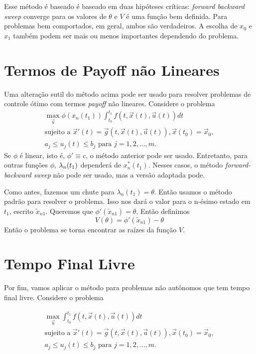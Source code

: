 Esse método é baseado é baseado em duas hipóteses críticas: \textit{forward
backward sweep} converge para os valores de $\theta$ e $V$ é uma função bem
definida. Para problemas bem comportados, em geral, ambos são verdadeiros. A
escolha de $x_0$ e $x_1$ também podem ser mais ou menos importantes dependendo
do problema. 

\section{Termos de Payoff não Lineares}

Uma alteração sutil do método acima pode ser usado para resolver problemas de
controle ótimo com termos \textit{payoff} não lineares. Considere o problema 
\begin{gather*}
    \max_{\vec{u}} \phi(x_n(t_1)) \int_{t_0}^{t_1} f(t, \vec{x}(t), \vec{u}(t)) dt \\ 
    \text{sujeito a   }\vec{x}'(t) = \vec{g}(t, \vec{x}(t), \vec{u}(t)),  
    \vec{x}(t_0) = \vec{x}_0,  \\
    a_j \le u_j(t) \le b_j \text{ para }j = 1,2,...,m.
\end{gather*}
Se $\phi$ é linear, isto é, $\phi ' \equiv c$, o método anterior pode ser
usado. Entretanto, para outras funções $\phi$, $\lambda_n(t_1)$ dependerá de
$x_n^*(t_1)$. Nesses casos, o método \textit{forward-backward sweep} não pode
ser usado, mas a versão adaptada pode.  

Como antes, fazemos um chute para $\lambda_n(t_1) = \theta$. Então usamos o
método padrão para resolver o problema. Isso nos dará o valor para o n-ésimo
estado em $t_1$, escrito $\tilde{x}_{n1}$. Queremos que $\phi
'(\tilde{x}_{n1}) = \theta$. Então definimos 
$$
V(\theta) = \phi '(\tilde{x}_{n1}) - \theta
$$
Então o problema se torna encontrar as raízes da função $V$. 

\section{Tempo Final Livre}

Por fim, vamos aplicar o método para problemas não autônomos que tem tempo
final livre. Considere o problema 

\begin{gather*}
    \max_{\vec{u}} \int_{t_0}^{t_1} f(t, \vec{x}(t), \vec{u}(t)) dt \\ 
    \text{sujeito a }\vec{x}'(t) = \vec{g}(t, \vec{x}(t), \vec{u}(t)) ,  
    \vec{x}(t_0) = \vec{x}_0, \\
    a_j \le u_j(t) \le b_j \text{ para }j = 1,2,...,m.
\end{gather*}

